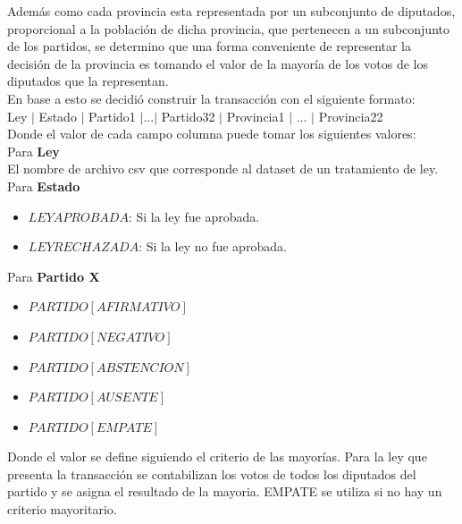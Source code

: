 \documentclass{endm}
\begin{document}
Además como cada provincia esta representada por un subconjunto de diputados, proporcional a la población de dicha provincia, que pertenecen a un subconjunto de los partidos, se determino que una forma conveniente de representar la decisión de la provincia es tomando el valor de la mayoría de los votos de los diputados que la representan. \\

En base a esto se decidió construir la transacción con el siguiente formato: \\

Ley $|$ Estado $|$ Partido1 $|$...$|$ Partido32 $|$ Provincia1 $|$ ... $|$ Provincia22 \\

Donde el valor de cada campo columna puede tomar los siguientes valores: \\

Para \textbf{Ley} \\

El nombre de archivo csv que corresponde al dataset de un tratamiento de ley. \\

Para \textbf{Estado} \\

\begin{itemize}
\item $LEY APROBADA$: Si la ley fue aprobada.
\item $LEY RECHAZADA$: Si la ley no fue aprobada. \\
\end{itemize}

 Para \textbf{Partido X} \\

\begin{itemize}
\item $PARTIDO [AFIRMATIVO]$
\item $PARTIDO [NEGATIVO]$
\item $PARTIDO [ABSTENCION]$
\item $PARTIDO [AUSENTE]$ 
\item $PARTIDO [EMPATE]$ \\
\end{itemize}

Donde el valor se define siguiendo el criterio de las mayorías. Para la ley que presenta la transacción se contabilizan los votos de todos los diputados del partido
y se asigna el resultado de la mayoria. EMPATE se utiliza si no hay un criterio mayoritario. \\
\end{document}

